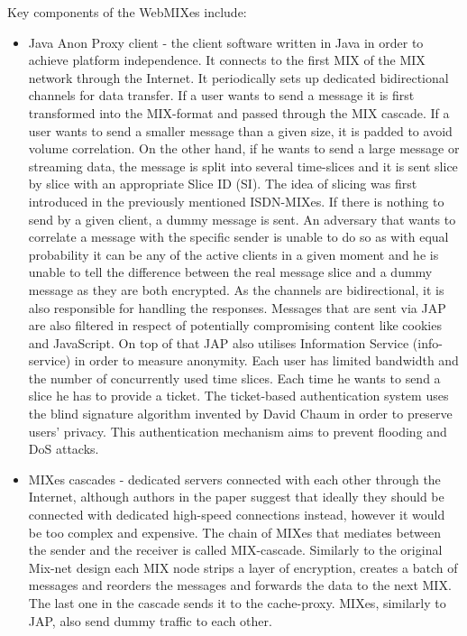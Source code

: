 Key components of the WebMIXes include: 
\begin{itemize}
    \item Java Anon Proxy client - the client software written in Java in order to achieve platform independence. It connects to the first MIX of the MIX network through the Internet. It periodically sets up dedicated bidirectional channels for data transfer. If a user wants to send a message it is first transformed into the MIX-format and passed through the MIX cascade. If a user wants to send a smaller message than a given size, it is padded to avoid volume correlation. On the other hand, if he wants to send a large message or streaming data, the message is split into several time-slices and it is sent slice by slice with an appropriate Slice ID (SI). The idea of slicing was first introduced in the previously mentioned ISDN-MIXes. If there is nothing to send by a given client, a dummy message is sent. An adversary that wants to correlate a message with the specific sender is unable to do so as with equal probability it can be any of the active clients in a given moment and he is unable to tell the difference between the real message slice and a dummy message as they are both encrypted. As the channels are bidirectional, it is also responsible for handling the responses. Messages that are sent via JAP are also filtered in respect of potentially compromising content like cookies and JavaScript. On top of that JAP also utilises Information Service (info-service) in order to measure anonymity. Each user has limited bandwidth and the number of concurrently used time slices. Each time he wants to send a slice he has to provide a ticket. The ticket-based authentication system uses the blind signature algorithm invented by David Chaum \cite{blind-signatures} in order to preserve users' privacy. This authentication mechanism aims to prevent flooding and DoS attacks.
    \item MIXes cascades - dedicated servers connected with each other through the Internet, although authors in the paper suggest that ideally they should be connected with dedicated high-speed connections instead, however it would be too complex and expensive. The chain of MIXes that mediates between the sender and the receiver is called MIX-cascade. Similarly to the original Mix-net design each MIX node strips a layer of encryption, creates a batch of messages and reorders the messages and forwards the data to the next MIX. The last one in the cascade sends it to the cache-proxy. MIXes, similarly to JAP, also send dummy traffic to each other.

\end{itemize}
